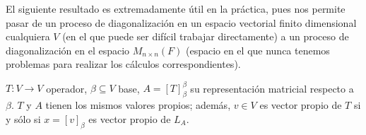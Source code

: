 El siguiente resultado es extremadamente útil en la práctica,
pues nos permite pasar de un proceso de diagonalización en un
espacio vectorial finito dimensional cualquiera $V$
(en el que puede ser difícil trabajar directamente) a un proceso
de diagonalización en el espacio $M_{n \times n} (F)$ 
(espacio en el que nunca tenemos problemas para realizar los
cálculos correspondientes). 
\begin{prop}
	\label{prop: autovectores de T sii de su analogo en matrices}
$T: V \longrightarrow V$ operador, $\beta \subseteq V$ base,
$A = [T]_{\beta}^{\beta}$ su representación matricial respecto a $\beta$.
$T$ y $A$ tienen los mismos valores propios; además,
$v \in V$ es vector propio de $T$ si y sólo si $x = [v]_{\beta}$
es vector propio de $L_{A}$. 
\end{prop}
